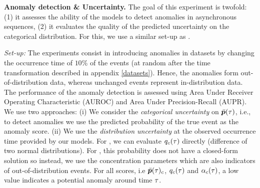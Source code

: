 \textbf{Anomaly detection \& Uncertainty.} The goal of this experiment is twofold: (1) it assesses the ability of the models to detect anomalies in asynchronous sequences, (2) it evaluates the quality of the predicted uncertainty on the categorical distribution. For this, we use a similar set-up as \citep{PriorNetworks}.

\textit{Set-up:} The experiments consist in introducing anomalies in datasets by changing the occurrence time of $10$\% of the events (at random after the time transformation described in appendix \ref{datasets}). Hence, the anomalies form out-of-distribution data, whereas unchanged events represent in-distribution data. The performance of the anomaly detection is assessed using Area Under Receiver Operating Characteristic (AUROC) and Area Under Precision-Recall (AUPR). We use two approaches: (i) We consider the \textit{categorical uncertainty} on $\bar{\bm{p}}(\tau)$, i.e., to detect anomalies we use the predicted probability of the true event as the anomaly score. (ii) We use the \textit{distribution uncertainty} at the observed occurrence time provided by our models. For \GPModel, we can evaluate  $q_c(\tau)$ directly (difference of two normal distributions). For \DirModel, this probability does not have a closed-form solution so instead, we use the concentration parameters which are also indicators of out-of-distribution events. For all scores, i.e $\bar{\bm{p}}(\tau)_c$, $q_c(\tau)$ and $\alpha_c(\tau)$, a low value indicates a potential anomaly around time $\tau$.

